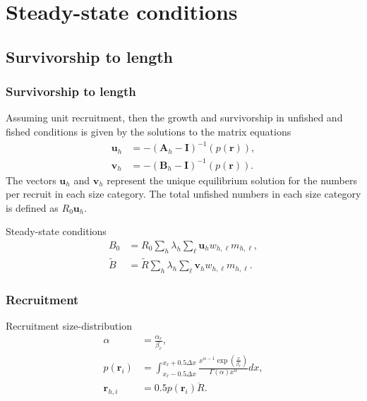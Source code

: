 \documentclass{beamer}
\begin{document}
\section{Steady-state conditions}


\subsection{Survivorship to length}
\begin{frame}
\frametitle{Survivorship to length}
Assuming unit recruitment, then the growth and survivorship in unfished and
fished conditions is given by the solutions to the matrix equations
\begin{align*}
  \boldsymbol{u}_h &= -(\boldsymbol{A}_h - \boldsymbol{I})^{-1} (p(\boldsymbol{r})),\\
  \boldsymbol{v}_h &= -(\boldsymbol{B}_h - \boldsymbol{I})^{-1} (p(\boldsymbol{r})).
\end{align*}
The vectors $\boldsymbol{u}_h$ and $\boldsymbol{v}_h$ represent the unique
equilibrium solution for the numbers per recruit in each size category. The
total unfished numbers in each size category is defined as $R_0
\boldsymbol{u}_h$.

Steady-state conditions
\begin{align*}
  B_0 &= R_0 \sum_h \lambda_h \sum_\ell \boldsymbol{u}_h w_{h,\ell} m_{h,\ell},\\
  \tilde{B} &= \tilde{R} \sum_h \lambda_h \sum_\ell \boldsymbol{v}_h w_{h,\ell}
  m_{h,\ell}.
\end{align*}
\end{frame}


\begin{frame}
\frametitle{Recruitment}

Recruitment size-distribution
\begin{align*}
  \alpha &= \frac{\alpha_r}{\beta_r},\\
  p(\boldsymbol{r}_i) &= \int^{x_\ell+0.5 \Delta x}_{x_\ell-0.5 \Delta x}
  \frac{x^{\alpha-1} \exp
    \left(\frac{x}{\beta_r}\right)}{\Gamma (\alpha) x^\alpha} dx,\\
  \boldsymbol{r}_{h,i} &= 0.5 p(\boldsymbol{r}_i) \ddot{R}.
\end{align*}

\end{frame}
\end{document}
